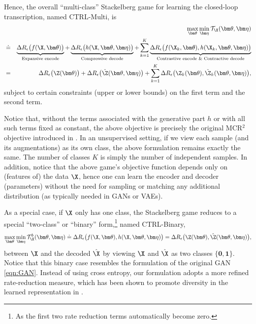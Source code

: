 \documentclass[../../book-main.tex]{subfiles}
\begin{document}
Hence, the overall ``multi-class'' Stackelberg game for learning the
closed-loop transcription, named CTRL-Multi, is
\begin{eqnarray}
    &&\max_{\bm \theta} \min_{\bm \eta} \mathcal{T}_{\X}(\bm \theta,
    \bm \eta) \\
    &\doteq& \underbrace{\Delta R_\epsilon\big(f(\X,\bm
    \theta)\big)}_{\text{Expansive encode}} + \underbrace{\Delta
        R_\epsilon\big(h(\X,\bm \theta, \bm
    \eta)\big)}_{\text{Compressive decode}} + \sum_{k=1}^K
    \underbrace{\Delta R_\epsilon\big(f(\X_k,\bm \theta), h(\X_k,\bm
    \theta,\bm \eta)\big)}_{\text{Contrastive encode \& Contractive
    decode}}   \\
    &=& \Delta R_\epsilon\big(\Z(\bm \theta) \big) + \Delta
    R_\epsilon\big(\hat \Z(\bm \theta, \bm \eta)\big) + \sum_{k=1}^K
    \Delta R_\epsilon\big(\Z_k(
    \bm \theta), \hat \Z_k(\bm \theta, \bm \eta) \big),
    \label{eq:MCR2-GAN-objective}
\end{eqnarray}
subject to certain constraints (upper or lower bounds) on the first
term and the second term.

Notice that, without the terms associated with the generative part
$h$ or with all such terms fixed as constant, the above objective is
precisely the original MCR$^2$ objective introduced in
. In an unsupervised setting, if we view each
sample (and its augmentations) as its own class, the above
formulation remains exactly the same. The number of classes $K$ is
simply the number of independent samples. In addition, notice that
the above game's objective function depends only on (features of) the
data $\X$, hence one can learn the encoder and decoder (parameters)
without the need for sampling or matching any additional distribution
(as typically needed in GANs or VAEs).

As a special case, if $\X$ only has one class, the Stackelberg game
reduces to a special ``two-class'' or ``binary'' form,\footnote{As
the first two rate reduction terms automatically become zero.} named CTRL-Binary,
\begin{equation}
    \max_{\bm \theta} \min_{\bm \eta} \mathcal{T}^b_{\X}(\bm \theta,
    \bm \eta) \doteq \Delta R_\epsilon\big(f(\X,\bm \theta), h(\X,\bm
    \theta,\bm \eta)\big) = \Delta R_\epsilon\big(\Z(\bm \theta),
    \hat \Z(\bm \theta, \bm \eta)\big),
    \label{eq:MCR2-GAN-objective-binary}
\end{equation}
between $\X$ and the decoded $\hat\X$ by viewing $\X$ and $\hat \X$
as two classes $\{\bm 0, \bm 1\}$. Notice that this binary case
resembles the formulation of the original GAN \eqref{eqn:GAN}.
Instead of using cross entropy, our formulation adopts a more refined
rate-reduction measure, which has been shown to promote diversity in
the learned representation in . %
\end{document}
